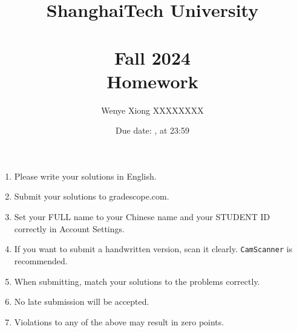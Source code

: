 \documentclass[11pt, addpoints, answers]{exam}
\title{
    \vspace{25pt}
    \LARGE ShanghaiTech University \\
    \bigskip
    \textbf{\CourseName} \\
    \textbf{Fall 2024}   \\
    \bigskip
    Homework \HomeworkNO
}
\author{Wenye Xiong XXXXXXXX}
\date{Due date: \DueDate, at 23:59}
\newcommand{\ttt}{\texttt}
\begin{document}
\maketitle

\begin{enumerate}
	\item Please write your solutions in English.
	\item Submit your solutions to gradescope.com.
	\item Set your FULL name to your Chinese name and your STUDENT ID correctly in Account Settings.
	\item If you want to submit a handwritten version, scan it clearly. \ttt{CamScanner} is recommended.
	\item When submitting, match your solutions to the problems correctly.
	\item No late submission will be accepted.
	\item Violations to any of the above may result in zero points.
\end{enumerate}

\begin{questions}
	
    \newpage
    
    \newpage
    
\end{questions}
\end{document}
